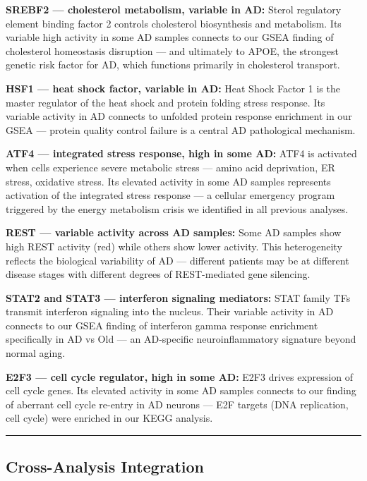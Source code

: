 \documentclass[
]{article}
\begin{document}
\textbf{SREBF2 --- cholesterol metabolism, variable in AD:} Sterol
regulatory element binding factor 2 controls cholesterol biosynthesis
and metabolism. Its variable high activity in some AD samples connects
to our GSEA finding of cholesterol homeostasis disruption --- and
ultimately to APOE, the strongest genetic risk factor for AD, which
functions primarily in cholesterol transport.

\textbf{HSF1 --- heat shock factor, variable in AD:} Heat Shock Factor 1
is the master regulator of the heat shock and protein folding stress
response. Its variable activity in AD connects to unfolded protein
response enrichment in our GSEA --- protein quality control failure is a
central AD pathological mechanism.

\textbf{ATF4 --- integrated stress response, high in some AD:} ATF4 is
activated when cells experience severe metabolic stress --- amino acid
deprivation, ER stress, oxidative stress. Its elevated activity in some
AD samples represents activation of the integrated stress response --- a
cellular emergency program triggered by the energy metabolism crisis we
identified in all previous analyses.

\textbf{REST --- variable activity across AD samples:} Some AD samples
show high REST activity (red) while others show lower activity. This
heterogeneity reflects the biological variability of AD --- different
patients may be at different disease stages with different degrees of
REST-mediated gene silencing.

\textbf{STAT2 and STAT3 --- interferon signaling mediators:} STAT family
TFs transmit interferon signaling into the nucleus. Their variable
activity in AD connects to our GSEA finding of interferon gamma response
enrichment specifically in AD vs Old --- an AD-specific
neuroinflammatory signature beyond normal aging.

\textbf{E2F3 --- cell cycle regulator, high in some AD:} E2F3 drives
expression of cell cycle genes. Its elevated activity in some AD samples
connects to our finding of aberrant cell cycle re-entry in AD neurons
--- E2F targets (DNA replication, cell cycle) were enriched in our KEGG
analysis.

\begin{center}\rule{0.5\linewidth}{0.5pt}\end{center}

\subsection{Cross-Analysis
Integration}\label{cross-analysis-integration}
\end{document}
